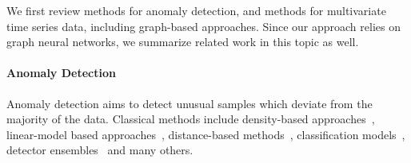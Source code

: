 \documentclass[letterpaper]{article} %
\begin{document}


We first review methods for anomaly detection, and methods for multivariate time series data, including graph-based approaches. Since our approach relies on graph neural networks, we summarize related work in this topic as well.

\paragraph{Anomaly Detection} 

Anomaly detection aims to detect unusual samples which deviate from the majority of the data. 
Classical methods include density-based approaches~\cite{breunig2000lof}, linear-model based approaches~\cite{pca}, distance-based methods~\cite{knn}, classification models~\cite{oneclasssvm}, detector ensembles~\cite{featurebagging} and many others. 
\end{document}
